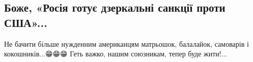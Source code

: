  
 
 
 
 
\subsection{Боже, «Росія готує дзеркальні санкції проти США»...}
\label{sec:16_04_2021.fb.jarosh_dmitrij.1.rossia_matreshki}

Не бачити більше нужденним американцям матрьошок, балалайок, самоварів і кокошників...😁😁😁
Геть важко, нашим союзникам, тепер буде жити!...🤣
